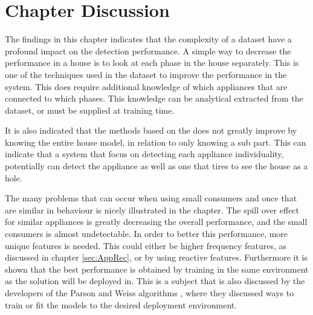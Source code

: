 \section{Chapter Discussion}
The findings in this chapter indicates that the complexity of a dataset have a profound impact on the detection performance. A simple way to decrease the performance in a house is to look at each phase in the house separately. This is one of the techniques used in the  dataset to improve the performance in the system. This does require additional knowledge of which appliances that are connected to which phases. This knowledge can be analytical extracted from the dataset, or must be supplied at training time. 

It is also indicated that the methods based on the  does not greatly improve by knowing the entire house model, in relation to only knowing a sub part. This can indicate that a system that focus on detecting each appliance individuality, potentially can detect the appliance as well as one that tires to see the house as a hole.   

The many problems that can occur when using small consumers and once that are similar in behaviour is nicely illustrated in the chapter. The spill over effect for similar appliances is greatly decreasing the overall performance, and the small consumers is almost undetectable. In order to better this performance, more unique features is needed. This could either be higher frequency features, as discussed in chapter \ref{sec:AppRec}, or by using reactive features. Furthermore it is shown that the best performance is obtained by training in the same environment as the solution will be deployed in. This is a subject that is also discussed by the developers of the Parson and Weiss algorithms \citep{RefWorks:28} \citep{RefWorks:23}, where they discussed ways to train or fit the models to the desired deployment environment.  